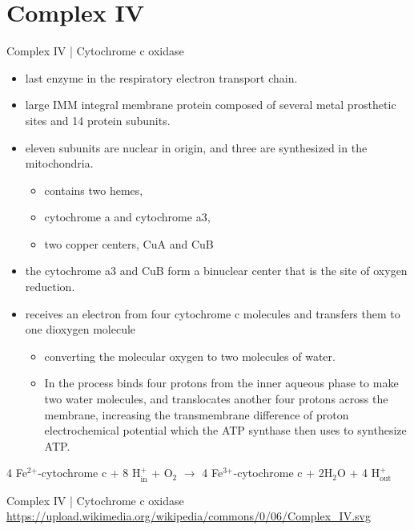 \documentclass[presentation, smaller]{beamer}
\begin{document}
\section{Complex IV}
\label{sec:org84f41f5}
\begin{frame}[label={sec:org92f24c4}]{Complex IV | Cytochrome c oxidase}
\begin{itemize}
\item last enzyme in the respiratory electron transport chain.
\item large IMM integral membrane protein composed of several metal prosthetic sites and 14 protein subunits.
\item eleven subunits are nuclear in origin, and three are synthesized in the mitochondria. 
\begin{itemize}
\item contains two hemes,
\item cytochrome a and cytochrome a3,
\item two copper centers, CuA and CuB
\end{itemize}
\item the cytochrome a3 and CuB form a binuclear center that is the site of oxygen reduction.

\item receives an electron from four cytochrome c molecules and transfers them to one dioxygen molecule
\begin{itemize}
\item converting the molecular oxygen to two molecules of water.
\item In the process binds four protons from the inner aqueous phase
to make two water molecules, and translocates another four protons
across the membrane, increasing the transmembrane difference of
proton electrochemical potential which the ATP synthase then uses to
synthesize ATP.
\end{itemize}
\end{itemize}

4 Fe\(^{\text{2+}}\)-cytochrome c + 8 H\(^{\text{+}}_{\text{in}}\) + O\(_{\text{2}}\) \(\to\)  4 Fe\(^{\text{3+}}\)-cytochrome c + 2H\(_{\text{2}}\)O + 4 H\(^{\text{+}}_{\text{out}}\)
\end{frame}

\begin{frame}[label={sec:org9cd44b7}]{Complex IV | Cytochrome c oxidase}
\url{https://upload.wikimedia.org/wikipedia/commons/0/06/Complex\_IV.svg}
\end{frame}
\end{document}
